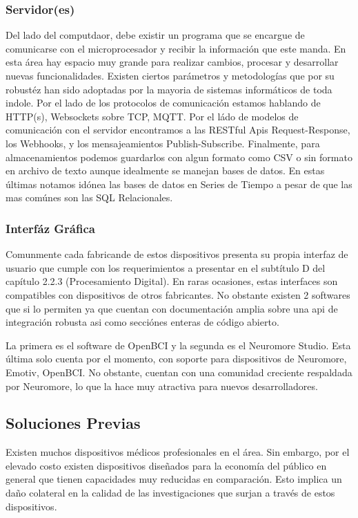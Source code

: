\documentclass[11pt]{article}
\begin{document}
\subsubsection{Servidor(es)}
\label{sec:org72cd3ac}
Del lado del computdaor, debe existir un programa que se encargue de comunicarse con el microprocesador y recibir la información que este manda. En esta área hay espacio muy grande para realizar cambios, procesar y desarrollar nuevas funcionalidades. Existen ciertos parámetros y metodologías que por su robustéz han sido adoptadas por la mayoria de sistemas informáticos de toda indole. Por el lado de los protocolos de comunicación estamos hablando de HTTP(s), Websockets sobre TCP, MQTT. Por el ládo de modelos de comunicación con el servidor encontramos a las RESTful Apis Request-Response, los Webhooks, y los mensajeamientos Publish-Subscribe. Finalmente, para almacenamientos podemos guardarlos con algun formato como CSV o sin formato en archivo de texto aunque idealmente se manejan bases de datos. En estas últimas notamos idónea las bases de datos en Series de Tiempo a pesar de que las mas comúnes son las SQL Relacionales.

\subsubsection{Interfáz Gráfica}
\label{sec:orgada7f0c}
Comunmente cada fabricande de estos dispositivos presenta su propia interfaz de usuario que cumple con los requerimientos a presentar en el subtítulo D del capítulo 2.2.3 (Procesamiento Digital). En raras ocasiones, estas interfaces son compatibles con dispositivos de otros fabricantes. No obstante existen 2 softwares que si lo permiten ya que cuentan con documentación amplia sobre una api de integración robusta asi como secciónes enteras de código abierto.

La primera es el software de OpenBCI y la segunda es el Neuromore Studio. Esta última solo cuenta por el momento, con soporte para dispositivos de Neuromore, Emotiv, OpenBCI. No obstante, cuentan con una comunidad creciente respaldada por Neuromore, lo que la hace muy atractiva para nuevos desarrolladores.

\subsection{Soluciones Previas}
\label{sec:orgca943f2}
Existen muchos dispositivos médicos profesionales en el área. Sin embargo, por el elevado costo existen dispositivos diseñados para la economía del público en general que tienen capacidades muy reducidas en comparación.
Esto implica un daño colateral en la calidad de las investigaciones que surjan a través de estos dispositivos.
\end{document}
